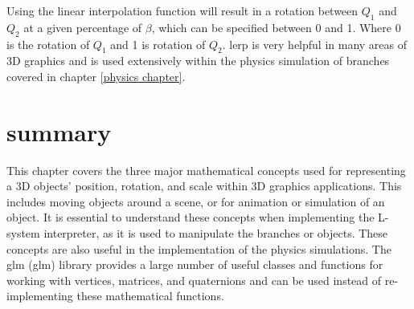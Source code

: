 \noindent
Using the linear interpolation function will result in a rotation between $Q_1$ and $Q_2$ at a given percentage of $\beta$, which can be specified between 0 and 1. Where 0 is the rotation of $Q_1$ and 1 is rotation of $Q_2$. \acrshort{lerp} is very helpful in many areas of 3D graphics and is used extensively within the physics simulation of branches covered in chapter \ref{physics chapter}.

\section{summary}

This chapter covers the three major mathematical concepts used for representing a 3D objects' position, rotation, and scale within 3D graphics applications. This includes moving objects around a scene, or for animation or simulation of an object. It is essential to understand these concepts when implementing the L-system interpreter, as it is used to manipulate the branches or objects. These concepts are also useful in the implementation of the physics simulations. The \acrlong{glm} (\acrshort{glm}) library provides a large number of useful classes and functions for working with vertices, matrices, and quaternions and can be used instead of re-implementing these mathematical functions.






